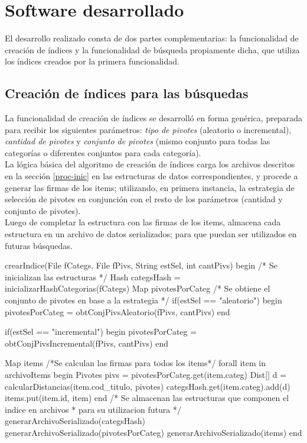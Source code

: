 \section{Software desarrollado}

El desarrollo realizado consta de dos partes complementarias: la funcionalidad de creaci\'on de \'indices y la funcionalidad de b\'usqueda propiamente dicha, que utiliza los \'indices creados por la primera funcionalidad.\\

\subsection{Creaci\'on de \'indices para las b\'usquedas}

La funcionalidad de creaci\'on de \'indices se desarroll\'o en forma gen\'erica, preparada para recibir los siguientes par\'ametros: \textit{tipo de pivotes} (aleatorio o incremental), \textit{cantidad de pivotes} y \textit{conjunto de pivotes} (mismo conjunto para todas las categor\'ias o diferentes conjuntos para cada categor\'ia).\\

La l\'ogica b\'asica del algoritmo de creaci\'on de \'indices carga los archivos descritos en la secci\'on  \ref{proc-inic} en las estructuras de datos correspondientes, y procede a generar las firmas de los items; utilizando, en primera instancia, la estrategia de selecci\'on de pivotes en conjunci\'on con el resto de los par\'ametros (cantidad y conjunto de pivotes).\\

Luego de completar la estructura con las firmas de los items, almacena cada estructura en un archivo de datos serializados; para que puedan ser utilizados en futuras b\'usquedas.\\

\begin{algorithm}[caption={Creaci\'on de \'indice}, label={alg1}]
crearIndice(File fCategs, File fPivs, String estSel, int cantPivs)
begin
 /* Se inicializan las estructuras */
 Hash categsHash = inicializarHashCategorias(fCategs)
 Map pivotesPorCateg
 /* Se obtiene el conjunto de pivotes en base a la estrategia */
 if(estSel == "aleatorio")
 begin
  pivotesPorCateg = obtConjPivsAleatorio(fPivs, cantPivs)
 end

 if(estSel == "incremental")
 begin
  pivotesPorCateg = obtConjPivsIncremental(fPivs, cantPivs)
 end

 Map items
 /*Se calculan las firmas para todos los items*/
 forall item in archivoItems
 begin
  Pivotes pivs = pivotesPorCateg.get(item.categ)
  Dist[] d = calcularDistancias(item.cod_titulo, pivotes)
  categsHash.get(item.categ).add(d)
  items.put(item.id, item)
 end
 /* Se almacenan las estructuras que componen el indice en archivos 
  * para su utilizacion futura */
 generarArchivoSerializado(categsHash)
 generarArchivoSerializado(pivotesPorCateg)
 generarArchivoSerializado(items)
end
\end{algorithm}

